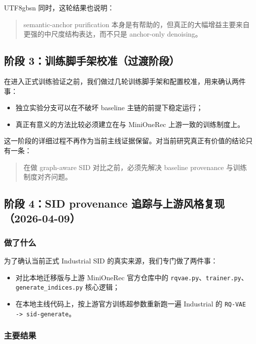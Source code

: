 \documentclass[11pt]{article}
\begin{document}
\begin{CJK*}{UTF8}{gbsn}
同时，这轮结果也说明：

\begin{quote}
semantic-anchor purification 本身是有帮助的，但真正的大幅增益主要来自更强的中尺度结构表达，而不只是 anchor-only denoising。
\end{quote}

\subsection{阶段 3：训练脚手架校准（过渡阶段）}

在进入正式训练验证之前，我们做过几轮训练脚手架和配置校准，用来确认两件事：

\begin{itemize}
  \item 独立实验分支可以在不破坏 baseline 主链的前提下稳定运行；
  \item 真正有意义的方法比较必须建立在与 MiniOneRec 上游一致的训练制度上。
\end{itemize}

这一阶段的详细过程不再作为当前主线证据保留。对当前研究真正有价值的结论只有一条：

\begin{quote}
在做 graph-aware SID 对比之前，必须先解决 baseline provenance 与训练制度对齐问题。
\end{quote}

\subsection{阶段 4：SID provenance 追踪与上游风格复现（2026-04-09）}

\subsubsection*{做了什么}

为了确认当前正式 Industrial SID 的真实来源，我们专门做了两件事：

\begin{itemize}
  \item 对比本地迁移版与上游 MiniOneRec 官方仓库中的 \texttt{rqvae.py}、\texttt{trainer.py}、\texttt{generate\_indices.py} 核心逻辑；
  \item 在本地主线代码上，按上游官方训练超参数重新跑一遍 Industrial 的 \texttt{RQ-VAE -> sid-generate}。
\end{itemize}

\subsubsection*{主要结果}


\end{CJK*}
\end{document}
